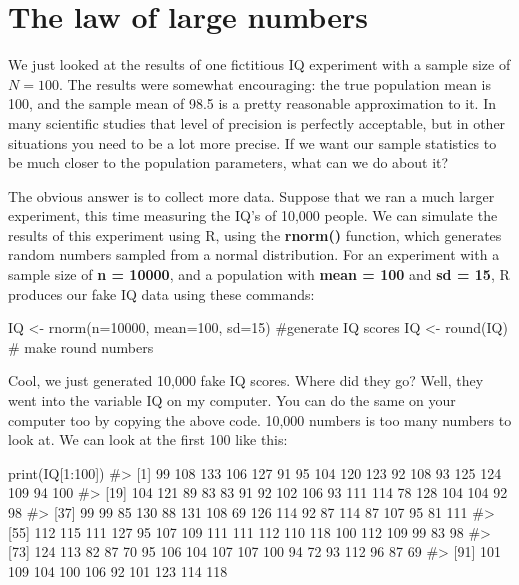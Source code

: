 \documentclass[
  letterpaper,
  DIV=11,
  numbers=noendperiod]{scrreprt}
\newenvironment{Shaded}{\begin{snugshade}}{\end{snugshade}}
\newcommand{\AttributeTok}[1]{\textcolor[rgb]{0.40,0.45,0.13}{#1}}
\newcommand{\CommentTok}[1]{\textcolor[rgb]{0.37,0.37,0.37}{#1}}
\newcommand{\DecValTok}[1]{\textcolor[rgb]{0.68,0.00,0.00}{#1}}
\newcommand{\FunctionTok}[1]{\textcolor[rgb]{0.28,0.35,0.67}{#1}}
\newcommand{\NormalTok}[1]{\textcolor[rgb]{0.00,0.23,0.31}{#1}}
\newcommand{\OtherTok}[1]{\textcolor[rgb]{0.00,0.23,0.31}{#1}}
\newcommand{\SpecialCharTok}[1]{\textcolor[rgb]{0.37,0.37,0.37}{#1}}
\begin{document}
\section{The law of large numbers}\label{the-law-of-large-numbers}

We just looked at the results of one fictitious IQ experiment with a
sample size of \(N=100\). The results were somewhat encouraging: the
true population mean is 100, and the sample mean of 98.5 is a pretty
reasonable approximation to it. In many scientific studies that level of
precision is perfectly acceptable, but in other situations you need to
be a lot more precise. If we want our sample statistics to be much
closer to the population parameters, what can we do about it?

The obvious answer is to collect more data. Suppose that we ran a much
larger experiment, this time measuring the IQ's of 10,000 people. We can
simulate the results of this experiment using R, using the
\textbf{rnorm()} function, which generates random numbers sampled from a
normal distribution. For an experiment with a sample size of \textbf{n =
10000}, and a population with \textbf{mean = 100} and \textbf{sd = 15},
R produces our fake IQ data using these commands:

\begin{Shaded}
\begin{Highlighting}[]
\NormalTok{IQ }\OtherTok{\textless{}{-}} \FunctionTok{rnorm}\NormalTok{(}\AttributeTok{n=}\DecValTok{10000}\NormalTok{, }\AttributeTok{mean=}\DecValTok{100}\NormalTok{, }\AttributeTok{sd=}\DecValTok{15}\NormalTok{) }\CommentTok{\#generate IQ scores}
\NormalTok{IQ }\OtherTok{\textless{}{-}} \FunctionTok{round}\NormalTok{(IQ) }\CommentTok{\# make round numbers}
\end{Highlighting}
\end{Shaded}

Cool, we just generated 10,000 fake IQ scores. Where did they go? Well,
they went into the variable IQ on my computer. You can do the same on
your computer too by copying the above code. 10,000 numbers is too many
numbers to look at. We can look at the first 100 like this:

\begin{Shaded}
\begin{Highlighting}[]
\FunctionTok{print}\NormalTok{(IQ[}\DecValTok{1}\SpecialCharTok{:}\DecValTok{100}\NormalTok{])}
\CommentTok{\#\textgreater{}   [1]  99 108 133 106 127  91  95 104 120 123  92 108  93 125 124 109  94 100}
\CommentTok{\#\textgreater{}  [19] 104 121  89  83  83  91  92 102 106  93 111 114  78 128 104 104  92  98}
\CommentTok{\#\textgreater{}  [37]  99  99  85 130  88 131 108  69 126 114  92  87 114  87 107  95  81 111}
\CommentTok{\#\textgreater{}  [55] 112 115 111 127  95 107 109 111 111 112 110 118 100 112 109  99  83  98}
\CommentTok{\#\textgreater{}  [73] 124 113  82  87  70  95 106 104 107 107 100  94  72  93 112  96  87  69}
\CommentTok{\#\textgreater{}  [91] 101 109 104 100 106  92 101 123 114 118}
\end{Highlighting}
\end{Shaded}
\end{document}
